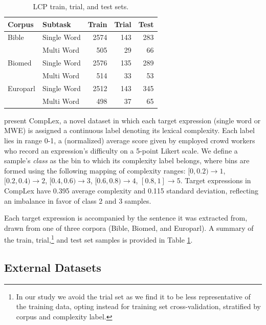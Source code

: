 \documentclass[11pt,a4paper]{article}
\begin{document}
\begin{table}
  \centering
  \begin{tabular}{l|l|r|r|r}
    \toprule
    \centering
    \textbf{Corpus} & \textbf{Subtask} & \textbf{Train} &  \textbf{Trial} & \textbf{Test} \\
    \midrule
    Bible & Single Word &   2574 &    143 &   283 \\
            & Multi Word &    505 &     29 &    66 \\
    \midrule
    Biomed & Single Word &   2576 &    135 &   289 \\
            & Multi Word &    514 &     33 &    53 \\
    \midrule
    Europarl & Single Word &   2512 &    143 &   345 \\
            & Multi Word &    498 &     37 &    65 \\
    \bottomrule
  \end{tabular}
  \caption{\label{tab:datasets} LCP train, trial, and test sets.}
\end{table}

\citet{shardlow2020complex} present CompLex, a novel dataset in which each target expression (single word or MWE) is assigned a continuous label denoting its lexical complexity. Each label lies in range 0-1, a (normalized) average score given by employed crowd workers who record an expression's difficulty on a 5-point Likert scale. We define a sample's \textit{class} as the bin to which its complexity label belongs, where bins are formed using the following mapping of complexity ranges: $[0,0.2) \rightarrow 1$, $[0.2, 0.4) \rightarrow 2$, $[0.4, 0.6) \rightarrow 3$, $[0.6, 0.8) \rightarrow 4$, $[0.8, 1] \rightarrow 5$. Target expressions in CompLex have 0.395 average complexity and 0.115 standard deviation, reflecting an imbalance in favor of class 2 and 3 samples. 

Each target expression is accompanied by the sentence it was extracted from, drawn from one of three corpora (Bible, Biomed, and Europarl). A summary of the train, trial,\footnote{In our study we avoid the trial set as we find it to be less representative of the training data, opting instead for training set cross-validation, stratified by corpus and complexity label.} and test set samples is provided in Table \ref{tab:datasets}.

\subsection{External Datasets}
\end{document}
